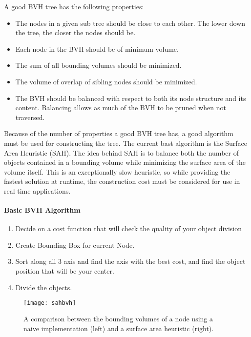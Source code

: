  A good BVH tree has the following properties:
 \begin{itemize}
 \item The nodes in a given sub tree should be close to each other. The lower down the tree, the closer the nodes should be.
 \item Each node in the BVH should be of minimum volume.
 \item The sum of all bounding volumes should be minimized.
 \item The volume of overlap of sibling nodes should be minimized.
 \item The BVH should be balanced with respect to both its node structure and its content. Balancing allows as much of the BVH to be pruned when not traversed.
 \end{itemize}
Because of the number of properties a good BVH tree has, a good algorithm must be used for constructing the tree.
The current bast algorithm is the Surface Area Heuristic (SAH).
The idea behind SAH is to balance both the number of objects contained in a bounding volume while minimizing the surface area of the volume itself.
This is an exceptionally slow heuristic, so while providing the fastest solution at runtime, the construction cost must be considered for use in real time applications.

\paragraph{Basic BVH Algorithm}
\begin{enumerate}
\item Decide on a cost function that will check the quality of your object division
\item Create Bounding Box for current Node.
\item Sort along all 3 axis and find the axis with the best cost, and find the object position that will be your center.
\item Divide the objects.
\end{enumerate}

\begin{figure}
\texttt{[image: sahbvh]}
\caption{A comparison between the bounding volumes of a node using a naive implementation (left) and a surface area heuristic (right).}
\end{figure}